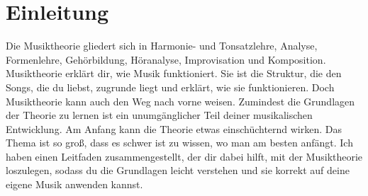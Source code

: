 \section{Einleitung}
Die Musiktheorie gliedert sich in Harmonie- und Tonsatzlehre, Analyse, 
Formenlehre, Gehörbildung, Höranalyse, Improvisation und Komposition.
Musiktheorie erklärt dir, wie Musik funktioniert. Sie ist die Struktur, die den Songs, die 
du liebst, zugrunde liegt und erklärt, wie sie funktionieren. Doch Musiktheorie kann 
auch den Weg nach vorne weisen. Zumindest die Grundlagen der Theorie zu lernen ist ein 
unumgänglicher Teil deiner musikalischen Entwicklung. Am Anfang kann die Theorie etwas 
einschüchternd wirken. Das Thema ist so groß, dass es schwer ist zu wissen, wo man am 
besten anfängt. Ich haben einen Leitfaden zusammengestellt, der dir dabei hilft, mit der Musiktheorie 
loszulegen, sodass du die Grundlagen leicht verstehen und sie korrekt auf deine eigene 
Musik anwenden kannst.

 
